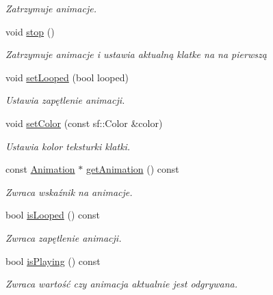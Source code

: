 \begin{DoxyCompactItemize}
\begin{DoxyCompactList}\small\item\em Zatrzymuje animacje. \end{DoxyCompactList}\item 
\hypertarget{class_animated_tex_ae8b62c21e84ad32ebc371284137d1b79}{void \hyperlink{class_animated_tex_ae8b62c21e84ad32ebc371284137d1b79}{stop} ()}\label{class_animated_tex_ae8b62c21e84ad32ebc371284137d1b79}

\begin{DoxyCompactList}\small\item\em Zatrzymuje animacje i ustawia aktualną klatke na na pierwszą \end{DoxyCompactList}\item 
void \hyperlink{class_animated_tex_a8414031e3cc3bda582d795df01fca65a}{set\-Looped} (bool looped)
\begin{DoxyCompactList}\small\item\em Ustawia zapętlenie animacji. \end{DoxyCompactList}\item 
void \hyperlink{class_animated_tex_aaa02af5734329917da31be2f52336773}{set\-Color} (const sf\-::\-Color \&color)
\begin{DoxyCompactList}\small\item\em Ustawia kolor teksturki klatki. \end{DoxyCompactList}\item 
const \hyperlink{class_animation}{Animation} $\ast$ \hyperlink{class_animated_tex_ace0aa8bb9be4e8e9843b4016c2ff591d}{get\-Animation} () const 
\begin{DoxyCompactList}\small\item\em Zwraca wskaźnik na animacje. \end{DoxyCompactList}\item 
bool \hyperlink{class_animated_tex_a502ded64b6add47ed8b50625e1867bbc}{is\-Looped} () const 
\begin{DoxyCompactList}\small\item\em Zwraca zapętlenie animacji. \end{DoxyCompactList}\item 
bool \hyperlink{class_animated_tex_a754cd308e993be565ac85b0727c5d2eb}{is\-Playing} () const 
\begin{DoxyCompactList}\small\item\em Zwraca wartość czy animacja aktualnie jest odgrywana. \end{DoxyCompactList}\item 

\end{DoxyCompactItemize}

